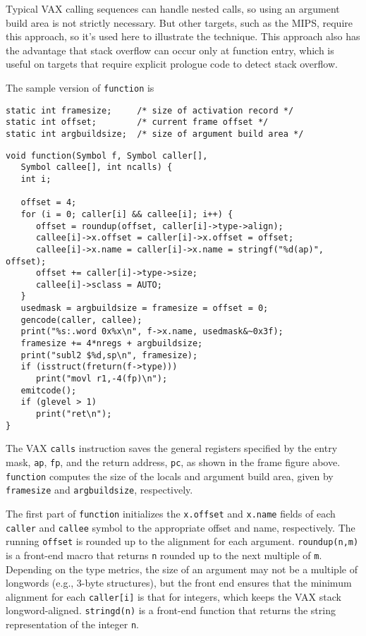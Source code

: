 Typical VAX calling sequences can handle nested calls,
so using an argument build area is not strictly necessary.
But other targets, such as the MIPS, require this approach,
so it's used here to illustrate the technique. This approach also
has the advantage that stack overflow can occur only at function
entry, which is useful on targets that require explicit
prologue code to detect stack overflow.

The sample version of \verb|function| is
\begin{verbatim}
static int framesize;     /* size of activation record */
static int offset;        /* current frame offset */
static int argbuildsize;  /* size of argument build area */

\end{verbatim}
\begin{verbatim}
void function(Symbol f, Symbol caller[],
   Symbol callee[], int ncalls) {
   int i;

   offset = 4;
   for (i = 0; caller[i] && callee[i]; i++) {
      offset = roundup(offset, caller[i]->type->align);
      callee[i]->x.offset = caller[i]->x.offset = offset;
      callee[i]->x.name = caller[i]->x.name = stringf("%d(ap)", offset);
      offset += caller[i]->type->size;
      callee[i]->sclass = AUTO;
   }
   usedmask = argbuildsize = framesize = offset = 0;
   gencode(caller, callee);
   print("%s:.word 0x%x\n", f->x.name, usedmask&~0x3f);
   framesize += 4*nregs + argbuildsize;
   print("subl2 $%d,sp\n", framesize);
   if (isstruct(freturn(f->type)))
      print("movl r1,-4(fp)\n");
   emitcode();
   if (glevel > 1)
      print("ret\n");
}
\end{verbatim}
The VAX \verb|calls| instruction saves the general registers specified
by the entry mask, \verb|ap|, \verb|fp|,
and the return address, \verb|pc|, as shown in the frame figure above.
\verb|function| computes the size of the locals and argument build area,
given by \verb|framesize| and \verb|argbuildsize|, respectively.

The first part of \verb|function| initializes the \verb|x.offset| and \verb|x.name| fields
of each \verb|caller| and \verb|callee| symbol to the appropriate offset and name, respectively.
The running \verb|offset| is rounded up to the alignment for each argument.
\verb|roundup(n,m)| is a front-end macro that returns \verb|n| rounded up to the
next multiple of \verb|m|. Depending on the type metrics, the size of an
argument may not be a multiple of longwords (e.g., 3-byte structures),
but the front end ensures that the minimum alignment for each \verb|caller[i]|
is that for integers, which keeps the VAX stack longword-aligned.
\verb|stringd(n)| is a front-end function that returns the string
representation of the integer \verb|n|.

